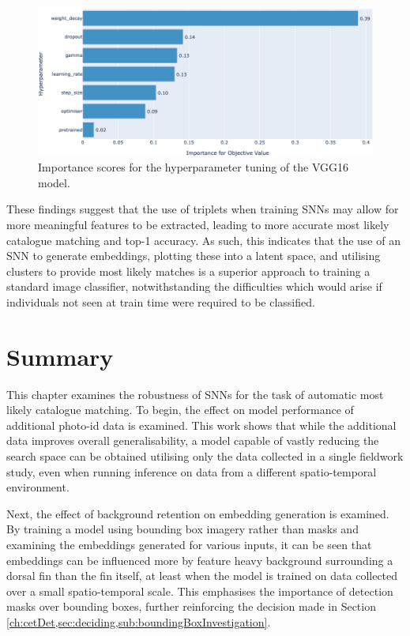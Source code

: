 \begin{figure}
	\begin{center}
		\includegraphics[scale=0.4]{Chapter7/figs/vgg16-baseline-hyperparam-importance-optuna-updated.png}
	\end{center}
	\caption{Importance scores for the hyperparameter tuning of the VGG16 model.}
	\label{fig:vgg16baseline-hyperparam-importance-optuna}
\end{figure}

These findings suggest that the use of triplets when training SNNs may allow for more meaningful features to be extracted, leading to more accurate most likely catalogue matching and top-1 accuracy. As such, this indicates that the use of an SNN to generate embeddings, plotting these into a latent space, and utilising clusters to provide most likely matches is a superior approach to training a standard image classifier, notwithstanding the difficulties which would arise if individuals not seen at train time were required to be classified.

\section{Summary}\label{ch:SNNEvaluation,sec:Summary}

This chapter examines the robustness of SNNs for the task of automatic most likely catalogue matching. To begin, the effect on model performance of additional photo-id data is examined. This work shows that while the additional data improves overall generalisability, a model capable of vastly reducing the search space can be obtained utilising only the data collected in a single fieldwork study, even when running inference on data from a different spatio-temporal environment.

Next, the effect of background retention on embedding generation is examined. By training a model using bounding box imagery rather than masks and examining the embeddings generated for various inputs, it can be seen that embeddings can be influenced more by feature heavy background surrounding a dorsal fin than the fin itself, at least when the model is trained on data collected over a small spatio-temporal scale. This emphasises the importance of detection masks over bounding boxes, further reinforcing the decision made in Section \ref{ch:cetDet,sec:deciding,sub:boundingBoxInvestigation}.

